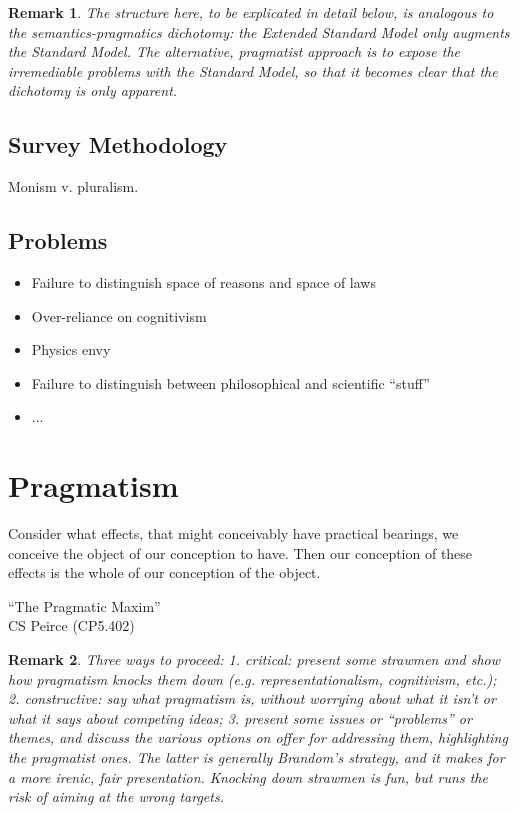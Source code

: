 \documentclass[11pt,twoside]{article}
\newtheorem{remark}{Remark}
\begin{document}
\begin{remark}
  The structure here, to be explicated in detail below, is analogous
  to the semantics-pragmatics dichotomy: the Extended Standard Model
  only augments the Standard Model.  The alternative, pragmatist
  approach is to expose the irremediable problems with the Standard
  Model, so that it becomes clear that the dichotomy is only apparent.
\end{remark}

\subsection{Survey Methodology}

Monism v. pluralism.

\subsection{Problems}

\begin{itemize}
\item Failure to distinguish space of reasons and space of laws
\item Over-reliance on cognitivism
\item Physics envy
\item Failure to distinguish between philosophical and scientific ``stuff''
\item ...
\end{itemize}

\section{Pragmatism}

\epigraph{Consider what effects, that might conceivably have practical bearings, we conceive the object of our conception to have. Then our conception of these effects is the whole of our conception of the object.}
{``The Pragmatic Maxim'' \\ CS Peirce (CP5.402)}

\begin{remark}
  Three ways to proceed: 1. critical: present some strawmen and show
  how pragmatism knocks them down (e.g. representationalism,
  cognitivism, etc.); 2.  constructive: say what pragmatism is,
  without worrying about what it isn't or what it says about competing
  ideas; 3. present some issues or ``problems'' or themes, and discuss
  the various options on offer for addressing them, highlighting the
  pragmatist ones.  The latter is generally Brandom's strategy, and it
  makes for a more irenic, fair presentation.  Knocking down strawmen
  is fun, but runs the risk of aiming at the wrong
  targets.
\end{remark}
\end{document}
